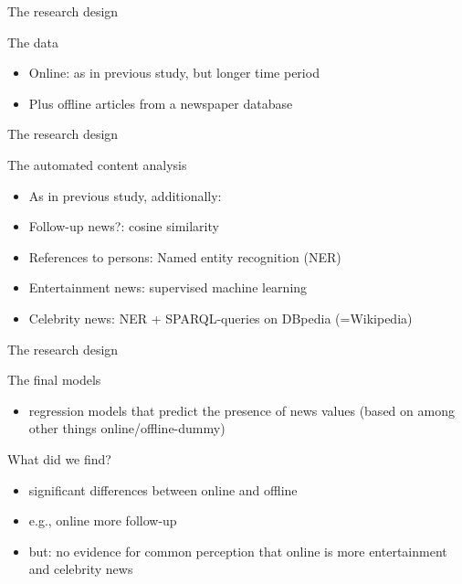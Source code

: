 \documentclass{beamer}
\begin{document}
\begin{frame}{The research design}
	\begin{block}{The data}
		\begin{itemize}
		\item Online: as in previous study, but longer time period
		\item Plus offline articles from a newspaper database
		\end{itemize}
	\end{block}
\end{frame}


\begin{frame}{The research design}
	\begin{block}{The automated content analysis}
	\begin{itemize}
	\item As in previous study, additionally:
	\item Follow-up news?: cosine similarity
	\item References to persons: Named entity recognition (NER)
	\item Entertainment news: supervised machine learning
	\item Celebrity news: NER + SPARQL-queries on DBpedia (=Wikipedia)
	\end{itemize}
	\end{block}
\end{frame}



\begin{frame}{The research design}
	\begin{block}{The final models}
		\begin{itemize}
			\item regression models that predict the presence of news values (based on among other things online/offline-dummy)
		\end{itemize}
	\end{block}
\end{frame}


\begin{frame}{What did we find?}
	\begin{itemize}
	\item significant differences between online and offline
	\item e.g., online more follow-up
	\item but: no evidence for common perception that online is more entertainment and celebrity news
	\end{itemize}
\end{frame}
\end{document}
